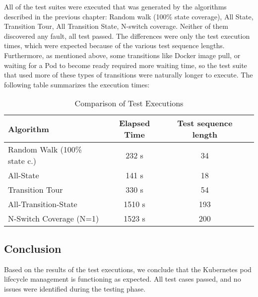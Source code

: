 \documentclass[main.tex]{subfiles}
\begin{document}
All of the test suites were executed that was generated by the algorithms described in the previous chapter:
Random walk (100\% state coverage), All State, Transition Tour, All Transition State, N-switch coverage. Neither of them discovered any fault, all test passed. The differences were only the test execution times, which were expected because of the various test sequence lengths. Furthermore, as mentioned above, some transitions like Docker image pull, or waiting for a Pod to become ready required more waiting time, so the test suite that used more of these types of transitions were naturally longer to execute.
The following table summarizes the execution times:
\begin{table}[h!]
\centering
\begin{tabular}{|l|c|c|c|}
\hline
\textbf{Algorithm}     & \textbf{Elapsed Time} & \textbf{Test sequence length}\\ \hline
Random Walk (100\% state c.)     & 232 s & 34 \\ \hline
All-State     & 141 s & 18 \\ \hline
Transition Tour     & 330 s    & 54 \\ \hline
All-Transition-State     & 1510 s  & 193\\ \hline
N-Switch Coverage (N=1)     &  1523 s   &  200 \\ \hline
\end{tabular}
\caption{Comparison of Test Executions}
\label{tab:test_exec_comparison}
\end{table}

\subsection{Conclusion}
Based on the results of the test executions, we conclude that the Kubernetes pod lifecycle management is functioning as expected. All test cases passed, and no issues were identified during the testing phase.
\end{document}
